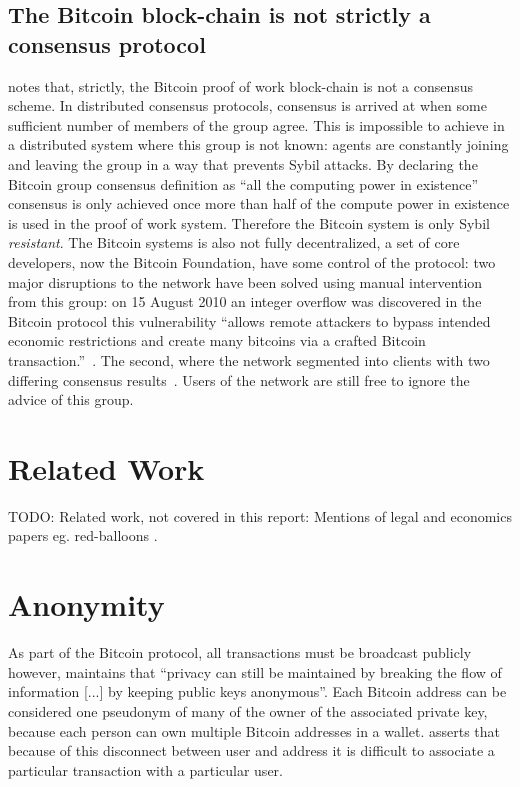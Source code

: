 \subsection{The Bitcoin block-chain is not strictly a consensus protocol}
\textcite{bitcoin-impossible} notes that, strictly, the Bitcoin proof of work block-chain is not a consensus scheme. In distributed consensus protocols, consensus is arrived at when some sufficient number of members of the group agree. This is impossible to achieve in a distributed system where this group is not known: agents are constantly joining and leaving the group in a way that prevents Sybil attacks. By declaring the Bitcoin group consensus definition as ``all the computing power in existence'' consensus is only achieved once more than half of the compute power in existence is used in the proof of work system. Therefore the Bitcoin system is only Sybil \emph{resistant}. The Bitcoin systems is also not fully decentralized, a set of core developers, now the Bitcoin Foundation, have some control of the protocol: two major disruptions to the network have been solved using manual intervention from this group: on 15 August 2010 an integer overflow was discovered in the Bitcoin protocol this vulnerability ``allows remote attackers to bypass intended economic restrictions and create many bitcoins via a crafted Bitcoin transaction.''~\cite{CVE-2010-5139}. The second, where the network segmented into clients with two differing consensus results~\cite{CVE-2013-3220,glitch-report,major-glitch}. Users of the network are still free to ignore the advice of this group.

\section{Related Work}
TODO: Related work, not covered in this report: Mentions of legal and economics papers eg. red-balloons \cite{red-balloons}.


\section{Anonymity}
As part of the Bitcoin protocol, all transactions must be broadcast publicly however, \textcite{satoshi} maintains that ``privacy can still be maintained by breaking the flow of information [...] by keeping public keys anonymous''.  Each Bitcoin address can be considered one pseudonym of many of the owner of the associated private key, because each person can own multiple Bitcoin addresses in a wallet. \textcite{satoshi} asserts that because of this disconnect between user and address it is difficult to associate a particular transaction with a particular user.


